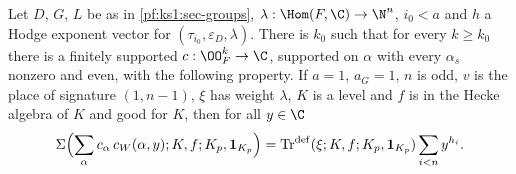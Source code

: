 \begin{proposition}\label{pf:ks1:prop-grouptop}
Let $D$, $G$, $L$ be as in \cref{pf:ks1:sec-groups}, $\lambda:\Hom(F,\C)\to\N^n$, $i_0<a$ and $h$ a Hodge exponent vector for
$(\tau_{i_0},\varepsilon_D,\lambda)$. There is $k_0$ such that for every $k\ge k_0$ there is a finitely supported $c:\OO_F^k\to\C$, supported on
$\alpha$ with every $\alpha_s$ nonzero and even, with the following property. If $a=1$, $a_G=1$, $n$ is odd, $v$ is the place of signature
$(1,n-1)$, $\xi$ has weight $\lambda$, $K$ is a level and $f$ is in the Hecke algebra of $K$ and good for $K$, then for all $y\in\C$
\begin{equation}\label{pf:ks1:eq-grouptop}
\Sigma\Bigl(\sum_\alpha c_\alpha\,c_W(\alpha,y);K,f;K_p,\mathbf 1_{K_p}\Bigr)=\mathrm{Tr}^{\mathrm{def}}(\xi;K,f;K_p,\mathbf 1_{K_p})\sum_{i<n}y^{h_i}.
\end{equation}
\end{proposition}

